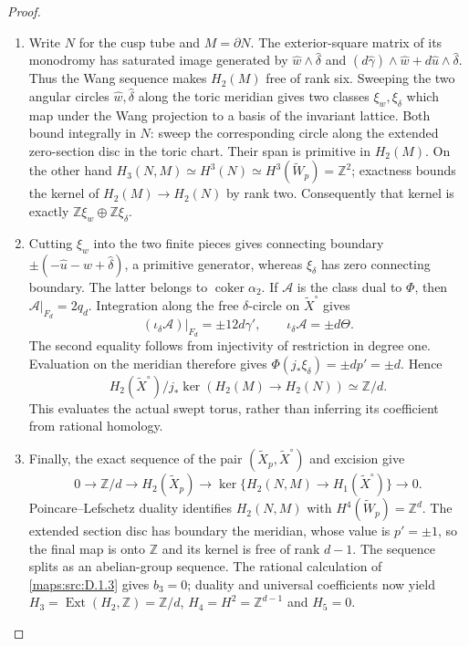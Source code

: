 \begin{proof}
\begin{enumerate}[label=\arabic*.,leftmargin=*]
\item Write $N$ for the cusp tube and $M=\partial N$. The exterior-square
matrix of its monodromy has saturated image generated by
$\widehat w\wedge\widehat\delta$ and
$(d\widehat\gamma)\wedge\widehat w+d\widehat u\wedge\widehat\delta$.
Thus the Wang sequence makes $H_2(M)$ free of rank six. Sweeping the
two angular circles $\widehat w,\widehat\delta$ along the toric
meridian gives two classes $\xi_w,\xi_\delta$ which map under the
Wang projection to a basis of the invariant lattice. Both bound
integrally in $N$: sweep the corresponding circle along the extended
zero-section disc in the toric chart. Their span is primitive in
$H_2(M)$. On the other hand
$H_3(N,M)\simeq H^3(N)\simeq H^3(\widetilde W_p)=\mathbb Z^2$;
exactness bounds the kernel of $H_2(M)\to H_2(N)$ by rank two.
Consequently that kernel is exactly
$\mathbb Z\xi_w\oplus\mathbb Z\xi_\delta$.

\item Cutting $\xi_w$ into the two finite pieces gives connecting boundary
$\pm(-\widehat u-\widehat w+\widehat\delta)$, a primitive generator,
whereas $\xi_\delta$ has zero connecting boundary. The latter belongs
to $\operatorname{coker}\alpha_2$. If $\mathcal A$ is the class dual
to $\Phi$, then $\mathcal A|_{F_d}=2q_d$. Integration along the
free $\delta$-circle on $\widetilde X^\circ$ gives
\[
 (\iota_\delta\mathcal A)|_{F_d}=\pm12d\gamma',
 \qquad \iota_\delta\mathcal A=\pm d\Theta.
\]
The second equality follows from injectivity of restriction in degree
one. Evaluation on the meridian therefore gives
$\Phi(j_*\xi_\delta)=\pm d p'=\pm d$. Hence
\[
 H_2(\widetilde X^\circ)/j_*\ker(H_2(M)\to H_2(N))
 \simeq\mathbb Z/d.
\]
This evaluates the actual swept torus, rather than inferring its
coefficient from rational homology.

\item Finally, the exact sequence of the pair
$(\widetilde X_p,\widetilde X^\circ)$ and excision give
\[
 0\longrightarrow\mathbb Z/d\longrightarrow H_2(\widetilde X_p)
 \longrightarrow\ker\{H_2(N,M)\to H_1(\widetilde X^\circ)\}
 \longrightarrow0.
\]
Poincare--Lefschetz duality identifies $H_2(N,M)$ with
$H^4(\widetilde W_p)=\mathbb Z^d$. The extended section disc has
boundary the meridian, whose value is $p'=\pm1$, so the final map is
onto $\mathbb Z$ and its kernel is free of rank $d-1$. The sequence
splits as an abelian-group sequence. The rational calculation of
\ref{maps:src:D.1.3} gives $b_3=0$; duality and universal coefficients now yield
$H_3=\operatorname{Ext}(H_2,\mathbb Z)=\mathbb Z/d$,
$H_4=H^2=\mathbb Z^{d-1}$ and $H_5=0$.
\end{enumerate}
\end{proof}

